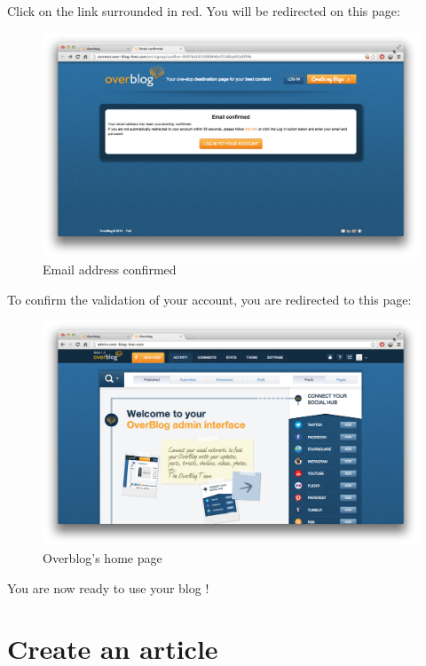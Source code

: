 \documentclass[a4paper,10pt]{article}
\begin{document}
\begin{enumerate}
Click on the link surrounded in red. You will be redirected on this page:

\begin{figure}[H]
    \center
	\includegraphics[width=13cm]{Images/addressMailConfirmed.png}
    \caption{Email address confirmed}
\end{figure}

To confirm the validation of your account, you are redirected to this page:

\begin{figure}[H]
    \center
	\includegraphics[width=13cm]{Images/overblogPage.png}
    \caption{Overblog's home page}
\end{figure}

You are now ready to use your blog !

\end{enumerate}


\newpage
\section{Create an article}
\end{document}
